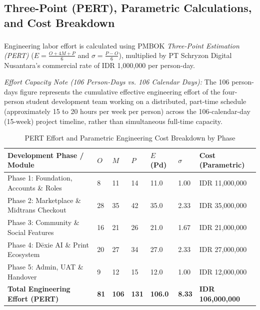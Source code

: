 \documentclass[11pt,a4paper]{article}
\newcommand{\thdr}[1]{\centering\arraybackslash\textbf{#1}}
\begin{document}
\clearpage

\subsection{Three-Point (PERT), Parametric Calculations, and Cost Breakdown}
Engineering labor effort is calculated using PMBOK\textsuperscript{\textregistered} \textit{Three-Point Estimation (PERT)} ($E = \frac{O + 4M + P}{6}$ and $\sigma = \frac{P - O}{6}$), multiplied by PT Schryzon Digital Nusantara's commercial rate of IDR 1,000,000 per person-day.

\textit{Effort Capacity Note (106 Person-Days vs. 106 Calendar Days):}
The 106 person-days figure represents the cumulative effective engineering effort of the four-person student development team working on a distributed, part-time schedule (approximately 15 to 20 hours per week per person) across the 106-calendar-day (15-week) project timeline, rather than simultaneous full-time capacity.

\begin{table}[H]
\centering
\caption{PERT Effort and Parametric Engineering Cost Breakdown by Phase}
\small
\begin{tabularx}{\textwidth}{| Y | C{0.8cm} | C{0.8cm} | C{0.8cm} | C{1.6cm} | C{1.0cm} | R{3.1cm} |}
\hline
{} \thdr{Development Phase / Module} & \thdr{$O$} & \thdr{$M$} & \thdr{$P$} & \thdr{$E$ (Pd)} & \thdr{$\sigma$} & \thdr{Cost (Parametric)} \\
\hline
Phase 1: Foundation, Accounts \& Roles & 8 & 11 & 14 & 11.0 & 1.00 & IDR 11,000,000 \\
\hline
Phase 2: Marketplace \& Midtrans Checkout & 28 & 35 & 42 & 35.0 & 2.33 & IDR 35,000,000 \\
\hline
Phase 3: Community \& Social Features & 16 & 21 & 26 & 21.0 & 1.67 & IDR 21,000,000 \\
\hline
Phase 4: D\={e}xie AI \& Print Ecosystem & 20 & 27 & 34 & 27.0 & 2.33 & IDR 27,000,000 \\
\hline
Phase 5: Admin, UAT \& Handover & 9 & 12 & 15 & 12.0 & 1.00 & IDR 12,000,000 \\
\hline
{} \textbf{Total Engineering Effort (PERT)} & \textbf{81} & \textbf{106} & \textbf{131} & \textbf{106.0} & \textbf{8.33} & \textbf{IDR 106,000,000} \\
\hline
\end{tabularx}
\end{table}
\end{document}
